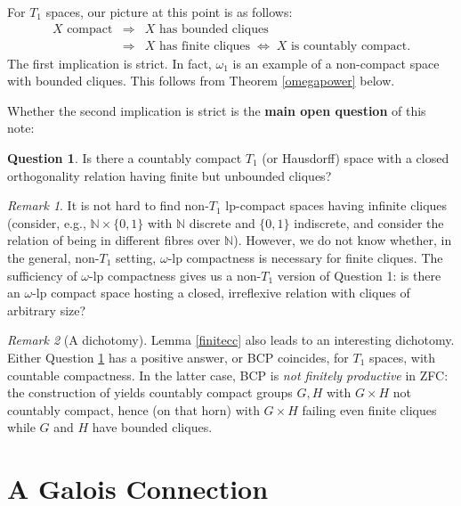 \documentclass[12pt]{article}
\newcommand{\N}{{\mathbb N}}
\theoremstyle{plain}
\theoremstyle{definition}
\newtheorem{question}{Question}
\theoremstyle{remark}
\newtheorem{remark}{Remark}
\begin{document}
For $T_1$ spaces, our picture at this point is as follows:
\begin{eqnarray*}
\mbox{$X$ compact} & \Rightarrow & \mbox{$X$ has bounded cliques} \\
& \Rightarrow & \mbox{$X$ has finite cliques} \; \Leftrightarrow \;
X \mbox{ is countably compact}.
\end{eqnarray*}
The first implication is strict. { In fact, 
$\omega_1$ is an example of a non-compact space with bounded cliques. This follows from Theorem \ref{omegapower} below.}

Whether the second implication is strict is the {\bf main open question} of this note:

\begin{question}\label{mainq}
Is there a countably compact $T_1$ (or Hausdorff) space with a closed orthogonality relation having finite but unbounded cliques?\\
\end{question}


\begin{remark}\label{nonT1} It is not hard to find non-$T_1$ lp-compact spaces having infinite cliques (consider, e.g., $\N \times \{0,1\}$ with $\N$ discrete and $\{0,1\}$ indiscrete, and 
consider the relation of being in different fibres over $\N$). However, we do not know whether, in the general, non-$T_1$ setting, $\omega$-lp compactness is necessary for finite cliques.  The sufficiency of $\omega$-lp compactness gives us a non-$T_1$ version of Question 1: 
is there an $\omega$-lp compact space hosting a closed, irreflexive relation with cliques of arbitrary 
size? \\
\end{remark}

\begin{remark}[A dichotomy]\label{dichotomy}
{ Lemma \ref{finitecc}} also leads to an interesting dichotomy. Either Question \ref{mainq} has a positive answer, or  BCP coincides, for $T_1$ spaces, with countable compactness. In the latter case, BCP is {\em not finitely productive} in ZFC: the construction of \cite{HvMRS} yields countably compact groups $G, H$ with $G \times H$ not countably compact, hence (on that horn) with $G \times H$ failing even finite cliques while $G$ and $H$ have bounded cliques. 
\end{remark}



\section{A Galois Connection} 
\end{document}
